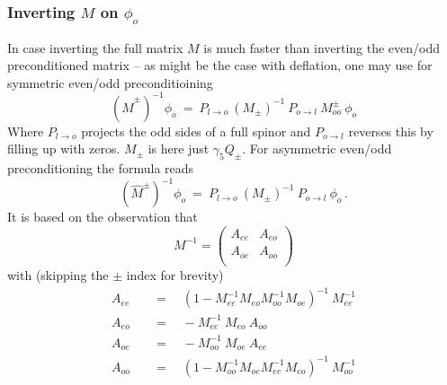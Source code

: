 \subsubsection{Inverting $M$ on $\phi_o$}

In case inverting the full matrix $M$ is much faster than inverting
the even/odd preconditioned matrix -- as might be the case with
deflation, one may use for symmetric even/odd preconditioining
\begin{equation}
  (\hat M^\pm)^{-1}\phi_o\ =\ P_{l\to o}\ (M_\pm)^{-1}\ P_{o\to l}\
  M^\pm_{oo}\ \phi_o
\end{equation}
Where $P_{l\to o}$ projects the odd sides of a full spinor and
$P_{o\to l}$ reverses this by filling up with zeros. $M_\pm$ is here just
$\gamma_5 Q_\pm$. For asymmetric even/odd preconditioning the formula
reads
\begin{equation}
  (\hat M^\pm)^{-1}\phi_o\ =\ P_{l\to o}\ (M_\pm)^{-1}\ P_{o\to l}\
  \phi_o\, .
\end{equation}
It is based on the observation that
\[
M^{-1} = 
\begin{pmatrix}
  A_{ee} & A_{eo} \\
  A_{oe} & A_{oo} \\
\end{pmatrix}
\]
with (skipping the $\pm$ index for brevity)
\[
\begin{split}
  A_{ee}\quad &=\quad (1- M_{ee}^{-1} M_{eo} M_{oo}^{-1} M_{oe})^{-1}\ M_{ee}^{-1} \\
  A_{eo}\quad &=\quad -M_{ee}^{-1}\ M_{eo}\ A_{oo} \\
  A_{oe}\quad &=\quad -M_{oo}^{-1}\ M_{oe}\ A_{ee} \\
  A_{oo}\quad &=\quad (1- M_{oo}^{-1} M_{oe} M_{ee}^{-1} M_{eo})^{-1}\ M_{oo}^{-1} \\
\end{split}
\]
\endinput

